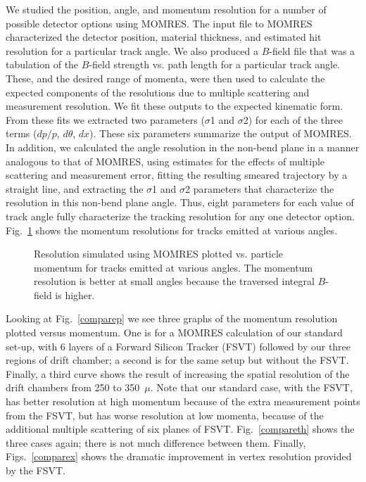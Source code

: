 We studied the position, angle, and momentum resolution for a number of 
possible detector options using MOMRES.  The input file to MOMRES
characterized the detector position, material thickness, and estimated hit 
resolution for a particular track angle.  We also produced a $B$-field file 
that was a tabulation of the $B$-field strength vs. path length for a 
particular track angle.  These, and the desired range of momenta, were then
used to calculate the expected components of the resolutions due to multiple 
scattering and measurement resolution.  We fit these outputs to the expected 
kinematic form.  From these fits we extracted two parameters ($\sigma$1 and 
$\sigma$2) for each of the three terms ($dp/p$, $d\theta$, $dx$).  These six 
parameters summarize the output of MOMRES.  In addition, we calculated the 
angle resolution in the non-bend plane in a manner analogous to that of MOMRES, 
using estimates for the effects of multiple scattering and measurement error, 
fitting the resulting smeared trajectory by a straight line, and extracting 
the $\sigma$1 and $\sigma$2 parameters that characterize the resolution in 
this non-bend plane angle.  Thus, eight parameters for each value of track 
angle fully characterize the tracking resolution for any one detector option.  
Fig.~\ref{dpvstheta} shows the momentum resolutions for tracks emitted at 
various angles.

\begin{figure}[ht]
\vspace{9.0cm}
\caption{\small{Resolution simulated using MOMRES plotted vs. particle 
momentum for tracks emitted at various angles.  The momentum resolution
is better at small angles because the traversed integral $B$-field is
higher.}}
\label{dpvstheta}
\end{figure}

Looking at Fig.~\ref{comparep} we see three graphs of the 
momentum resolution plotted versus momentum.  One is for a MOMRES 
calculation of our standard set-up, with 6 layers of a Forward Silicon Tracker
(FSVT) followed by our three regions of drift chamber; a second is for the 
same setup but without the FSVT.  Finally, a third curve 
shows the result of increasing the spatial resolution of the drift chambers 
from 250 to 350~$\mu$.  Note that our standard case, with the FSVT, has better 
resolution at high momentum because of the extra measurement points from the
FSVT, but has worse resolution at low momenta, because of the additional
multiple scattering of six planes of FSVT.  Fig.~\ref{compareth} shows the 
three cases again; there is not much difference between them.  Finally, 
Figs.~\ref{comparex} shows the dramatic improvement in vertex resolution 
provided by the FSVT. 

